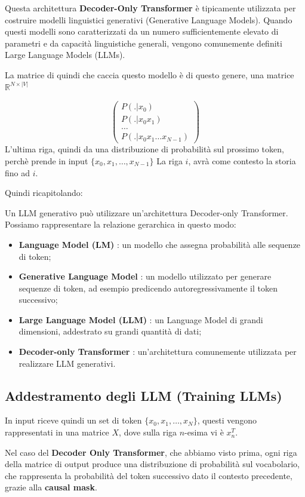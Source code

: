 Questa architettura \textbf{Decoder-Only Transformer} è tipicamente utilizzata per costruire modelli linguistici generativi (Generative Language Models). Quando questi modelli sono caratterizzati da un numero sufficientemente elevato di parametri e da capacità linguistiche generali, vengono comunemente definiti Large Language Models (LLMs).


La matrice di quindi che caccia questo modello è di questo genere, una matrice $\mathbb{R}^{N \times \left\lvert V \right\rvert}$

\[
\begin{pmatrix}
    P(.|x_0) \\
    P(. | x_0 x_1) \\
    \dots \\
    P(. | x_0 x_1 \dots x_{N-1})
\end{pmatrix}
\]
L'ultima riga, quindi da una distribuzione di probabilità sul prossimo token, perchè prende in input $\{x_0,x_1,\dots,x_{N-1}\}$
La riga $i$, avrà come contesto la storia fino ad $i$.

Quindi ricapitolando:

Un LLM generativo può utilizzare un'architettura Decoder-only Transformer.
Possiamo rappresentare la relazione gerarchica in questo modo:
\begin{itemize}
    \item \textbf{Language Model (LM)} : un modello che assegna probabilità alle sequenze di token;
    \item \textbf{Generative Language Model} : un modello utilizzato per generare sequenze di token, ad esempio predicendo autoregressivamente il token successivo;
    \item \textbf{Large Language Model (LLM)} : un Language Model di grandi dimensioni, addestrato su grandi quantità di dati;
    \item \textbf{Decoder-only Transformer} : un'architettura comunemente utilizzata per realizzare LLM generativi.
\end{itemize}

\subsection{Addestramento degli LLM (Training LLMs)}

In input riceve quindi un set di token
$\{x_0,x_1,\dots,x_N\}$, questi vengono rappresentati in una matrice
$X$, dove sulla riga $n$-esima vi è $x_n^T$.

Nel caso del \textbf{Decoder Only Transformer}, che abbiamo visto prima,
ogni riga della matrice di output produce una distribuzione di probabilità
sul vocabolario, che rappresenta la probabilità del token successivo
dato il contesto precedente, grazie alla \textbf{causal mask}.

